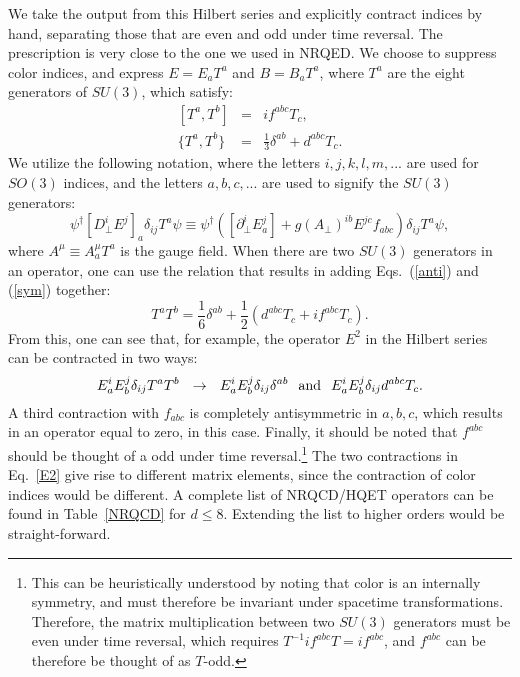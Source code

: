 \documentclass[prd,onecolumn, nofootinbib, 11pt]{revtex4}
\begin{document}
We take the output from this Hilbert series and explicitly contract indices by hand, separating those that are even and odd under time reversal.  
The prescription is very close to the one we used in NRQED.  We choose to suppress color indices, and express  $E = E_a T^a$ and $B=B_aT^a$, where $T^a$ are the eight generators of $SU(3)$, which satisfy: 
%
\begin{eqnarray}
\label{anti}
[T^a, T^b] &=& i f^{abc} T_c , \\
\label{sym}
\{T^a, T^b\} &=& \frac{1}{3} \delta^{ab} + d^{abc}T_c .
\end{eqnarray}
%
We utilize the following notation, where  the letters $i, j, k, l, m, ...$ are used for $SO(3)$ indices, and the letters $a, b, c, ...$ are used to signify the $SU(3)$ generators:
%
\begin{equation}
\psi^\dagger[D_\perp^i E^j]_a \delta_{ij} T^a \psi \equiv \psi^\dagger \left( [\partial_\perp^i E^j_a] + g(A_\perp)^{ib} E^{jc} f_{abc} \right) \delta_{ij} T^a \psi ,
\end{equation} 
%
where $A^{\mu}\equiv A^{\mu}_{a}T^{a}$ is the gauge field.  
When there are two $SU(3)$ generators in an operator, one can use the relation that results in adding Eqs.~(\ref{anti}) and (\ref{sym}) together:
%
\begin{equation}
\label{TaTb}
T^a T^b = \frac{1}{6} \delta^{ab} + \frac{1}{2}\left( d^{abc}T_c +  i f^{abc} T_c \right) .
\end{equation}
%
From this, one can see that, for example, the operator $E^2$ in the Hilbert series can be contracted in two ways:
%
\begin{equation}
\label{E2}
E^i_a E^j_b \delta_{ij} T^a T^b~~ \rightarrow~~ E^i_a E^j_b \delta_{ij}\delta^{ab} \hspace{0.1in} \text{and} \hspace{0.1in} E^i_a E^j_b \delta_{ij} d^{abc} T_c .
\end{equation}
%
A third contraction with $f_{abc}$ is completely antisymmetric in $a,b,c$, which results in an operator equal to zero, in this case.  Finally, it should be noted that $f^{abc}$ should be thought of a odd under time reversal.\footnote{This can be heuristically understood by noting that color is an internally symmetry, and must therefore be invariant under spacetime transformations.  Therefore, the matrix multiplication between two $SU(3)$ generators must be even under time reversal, which requires  $T^{-1}if^{abc}T = if^{abc}$, and $f^{abc}$ can be therefore be thought of as $T$-odd. }  The two contractions in Eq.~\eqref{E2}  give rise to different matrix elements, since the contraction of color indices would be different.  A complete list of NRQCD/HQET operators can be found in Table~\ref{NRQCD} for $d\leq 8$.  Extending the list to higher orders would be straight-forward. 
\end{document}
